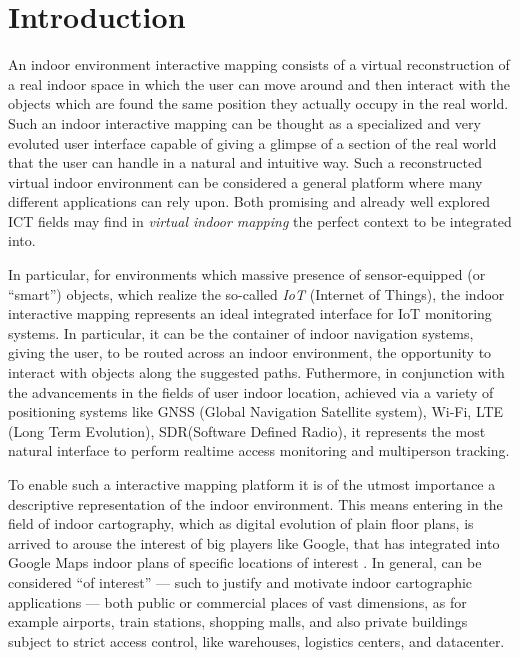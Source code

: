\section{Introduction}\label{introduction}

An indoor environment interactive mapping consists of a virtual reconstruction of a real indoor space in which the user can move around and then interact with the objects which are found the same position they actually occupy in the real world. Such an indoor interactive mapping can be thought as a specialized and very evoluted user interface capable of giving a glimpse of a section of the real world that the user can handle in a natural and intuitive way. 
Such a reconstructed virtual indoor environment can be considered a general platform where many different applications can rely upon.
Both promising and already well explored ICT fields may find in \emph{virtual indoor mapping} the perfect context to be integrated into.

In particular, for environments which massive presence of sensor-equipped (or ``smart'') objects, which realize the so-called \emph{IoT} (Internet of Things), the indoor interactive mapping represents an ideal integrated interface for IoT monitoring systems.
In particular, it can be the container of indoor navigation systems, giving the user, to be routed across an indoor environment, the opportunity to interact with objects along the suggested paths.
Futhermore, in conjunction with the advancements in the fields of user indoor location, achieved via a variety of positioning systems like GNSS (Global Navigation Satellite system), Wi-Fi, LTE (Long Term Evolution), SDR(Software Defined Radio), it represents the most natural interface to perform realtime access monitoring and multiperson tracking.

To enable such a interactive mapping platform it is of the utmost importance a descriptive representation of the indoor environment. This means entering in the field of indoor cartography, which as digital evolution of plain floor plans, is arrived to arouse the interest of big players like Google, that has integrated into Google Maps indoor plans of specific locations of interest \cite{indoormaps}. In general, can be considered ``of interest'' --- such to justify and motivate indoor cartographic applications --- both public or commercial places of vast dimensions, as for example airports, train stations, shopping malls, and also private buildings subject to strict access control, like warehouses, logistics centers, and datacenter. 

